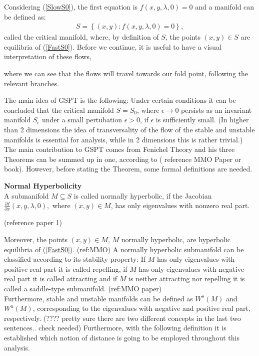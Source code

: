 Considering (\ref{SlowS0}), the first equation is $f(x,y,\lambda, 0)=0$ and a manifold can be defined as:
\begin{align} \label{CriticalS}
S= \left\{ (x,y) : f(x,y,\lambda, 0)=0 \right \},
\end{align}
called the critical manifold, where, by definition of $S$, the points $(x,y) \in S$ are equilibria of (\ref{FastS0}). Before we continue, it is useful to have a visual interpretation of these flows, 
\begin{figure}[h!]\centering
	\label{fig: vdp flow diagram}
\end{figure}
where we can see that the flows will travel towards our fold point, following the relevant branches.

The main idea of GSPT is the following: Under certain conditions it can be concluded that the critical manifold $S=S_0$, where $\epsilon \to 0$ persists as an invariant manifold $S_{\epsilon}$ under a small pertubation $\epsilon >0$, if $\epsilon$ is sufficiently small. 
(In higher than 2 dimensions the idea of transversality of the flow of the stable and unstable manifolds is essential for analysis, while in 2 dimensions this is rather trivial.)
The main contribution to GSPT comes from Fenichel Theory and his three Theorems can be summed up in one, according to ( reference MMO Paper or book).
However, before stating the Theorem, some formal definitions are needed.

\begin{definition}{\textbf{Normal Hyperbolicity}} \label{NormHyp}
	\\
	A submanifold $M \subseteq S$ is called normally hyperbolic, if the Jacobian $ \frac{\partial f}{\partial x}(x,y, \lambda, 0),$ where $(x,y) \in M$, has only eigenvalues with nonzero real part.
\end{definition} (reference paper 1)

Moreover, the points $(x,y) \in M$, $M$ normally hyperbolic, are hyperbolic equilibria of (\ref{FastS0}). (ref:MMO)
A normally hyperbolic submanifold can be classified according to its stability property: If $M$ has only eigenvalues with positive real part it is called repelling, if $M$ has only eigenvalues with negative real part it is called attracting and if $M$ is neither attracting nor repelling it is called a saddle-type submanifold. (ref:MMO paper) \\
Furthermore, stable and unstable manifolds can be defined as $W^s(M)$  and $W^u(M)$, corresponding to the eigenvalues with negative and positive real part, respectively.
(???? pretty sure there are two different concepts in the last two sentences.. check needed)
Furthermore, with the following definition it is established which notion of distance is going to be employed throughout this analysis.

